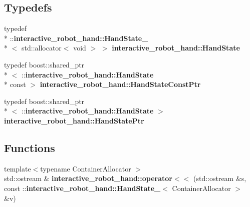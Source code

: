 \subsection*{Typedefs}
\begin{DoxyCompactItemize}
\item 
typedef \\*
\-::{\bf interactive\-\_\-robot\-\_\-hand\-::\-Hand\-State\-\_\-}\\*
$<$ std\-::allocator$<$ void $>$ $>$ {\bf interactive\-\_\-robot\-\_\-hand\-::\-Hand\-State}
\item 
typedef boost\-::shared\-\_\-ptr\\*
$<$ \-::{\bf interactive\-\_\-robot\-\_\-hand\-::\-Hand\-State} \\*
const  $>$ {\bf interactive\-\_\-robot\-\_\-hand\-::\-Hand\-State\-Const\-Ptr}
\item 
typedef boost\-::shared\-\_\-ptr\\*
$<$ \-::{\bf interactive\-\_\-robot\-\_\-hand\-::\-Hand\-State} $>$ {\bf interactive\-\_\-robot\-\_\-hand\-::\-Hand\-State\-Ptr}
\end{DoxyCompactItemize}
\subsection*{Functions}
\begin{DoxyCompactItemize}
\item 
{\footnotesize template$<$typename Container\-Allocator $>$ }\\std\-::ostream \& {\bf interactive\-\_\-robot\-\_\-hand\-::operator$<$$<$} (std\-::ostream \&s, const \-::{\bf interactive\-\_\-robot\-\_\-hand\-::\-Hand\-State\-\_\-}$<$ Container\-Allocator $>$ \&v)
\end{DoxyCompactItemize}
